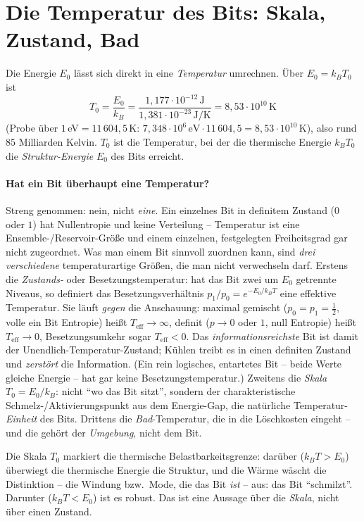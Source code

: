 \section{Die Temperatur des Bits: Skala, Zustand, Bad}
Die Energie $E_0$ lässt sich direkt in eine \emph{Temperatur} umrechnen. Über $E_0=k_B T_0$ ist
\[
T_0=\frac{E_0}{k_B}=\frac{1{,}177\cdot10^{-12}\,\text{J}}{1{,}381\cdot10^{-23}\,\text{J/K}}
   =8{,}53\cdot10^{10}\,\text{K}
\]
(Probe über $1$\,eV$=11\,604{,}5$\,K: $7{,}348\cdot10^6\,\text{eV}\cdot11\,604{,}5=8{,}53\cdot10^{10}$\,K),
also rund $85$ Milliarden Kelvin. $T_0$ ist die Temperatur, bei der die thermische Energie $k_B T_0$ die
\emph{Struktur-Energie} $E_0$ des Bits erreicht.

\paragraph{Hat ein Bit überhaupt eine Temperatur?} Streng genommen: nein, nicht \emph{eine}. Ein einzelnes
Bit in definitem Zustand ($0$ oder $1$) hat Nullentropie und keine Verteilung -- Temperatur ist eine
Ensemble-/Reservoir-Größe und einem einzelnen, festgelegten Freiheitsgrad gar nicht zugeordnet. Was man
einem Bit sinnvoll zuordnen kann, sind \emph{drei verschiedene} temperaturartige Größen, die man nicht
verwechseln darf. Erstens die \emph{Zustands-} oder Besetzungstemperatur: hat das Bit zwei um $E_0$
getrennte Niveaus, so definiert das Besetzungsverhältnis $p_1/p_0=e^{-E_0/k_B T}$ eine effektive
Temperatur. Sie läuft \emph{gegen} die Anschauung: maximal gemischt ($p_0=p_1=\tfrac12$, volle ein Bit
Entropie) heißt $T_\text{eff}\to\infty$, definit ($p\to0$ oder $1$, null Entropie) heißt
$T_\text{eff}\to0$, Besetzungsumkehr sogar $T_\text{eff}<0$. Das \emph{informationsreichste} Bit ist damit
der Unendlich-Temperatur-Zustand; Kühlen treibt es in einen definiten Zustand und \emph{zerstört} die
Information. (Ein rein logisches, entartetes Bit -- beide Werte gleiche Energie -- hat gar keine
Besetzungstemperatur.) Zweitens die \emph{Skala} $T_0=E_0/k_B$: nicht \enquote{wo das Bit sitzt}, sondern
der charakteristische Schmelz-/Aktivierungspunkt aus dem Energie-Gap, die natürliche Temperatur-\emph{Einheit}
des Bits. Drittens die \emph{Bad}-Temperatur, die in die Löschkosten eingeht -- und die gehört der
\emph{Umgebung}, nicht dem Bit.

Die Skala $T_0$ markiert die thermische Belastbarkeitsgrenze: darüber ($k_B T>E_0$) überwiegt die
thermische Energie die Struktur, und die Wärme wäscht die Distinktion -- die Windung bzw.\ Mode, die das
Bit \emph{ist} -- aus: das Bit \enquote{schmilzt}. Darunter ($k_B T<E_0$) ist es robust. Das ist eine
Aussage über die \emph{Skala}, nicht über einen Zustand.

